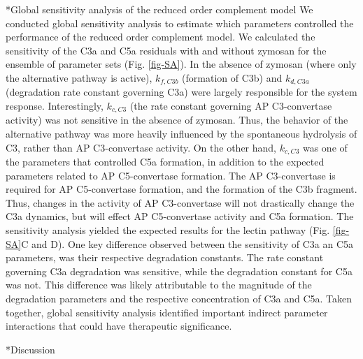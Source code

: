 \documentclass[12pt]{article}
\makeatletter
\renewcommand\subsection{\@startsection
	{subsection}{2}{0mm}
	{-0.05in}
	{-0.5\baselineskip}
	{\normalfont\normalsize\bfseries}}
\renewcommand\section{\@startsection
	{subsection}{2}{0mm}
	{-0.2in}
	{0.05\baselineskip}
	{\normalfont\large\bfseries}}
\makeatother
\begin{document}
\subsection*{Global sensitivity analysis of the reduced order complement model}
We conducted global sensitivity analysis to estimate which parameters controlled the performance of the reduced order complement model.
We calculated the sensitivity of the C3a and C5a residuals with and without zymosan for the ensemble of parameter sets (Fig. \ref{fig-SA}).
In the absence of zymosan (where only the alternative pathway is active), $k_{f,C3b}$ (formation of C3b) and $k_{d,C3a}$ (degradation rate constant governing C3a)
were largely responsible for the system response. Interestingly, $k_{c,C3}$ (the rate constant governing AP C3-convertase activity) was not sensitive in the absence of zymosan.
Thus, the behavior of the alternative pathway was more heavily influenced by the spontaneous hydrolysis of C3, rather than AP C3-convertase activity.
On the other hand, $k_{c,C3}$ was one of the parameters that controlled C5a formation, in addition to the expected parameters related to AP C5-convertase formation.
The AP C3-convertase is required for AP C5-convertase formation, and the formation of the C3b fragment.
Thus, changes in the activity of AP C3-convertase will not drastically change the C3a dynamics, but will effect AP C5-convertase activity and C5a formation.
The sensitivity analysis yielded the expected results for the lectin pathway (Fig. \ref{fig-SA}C and D).
One key difference observed between the sensitivity of C3a an C5a parameters, was their respective degradation constants.
The rate constant governing C3a degradation was sensitive, while the degradation constant for C5a was not.
This difference was likely attributable to the magnitude of the degradation parameters and the respective concentration of C3a and C5a.
Taken together, global sensitivity analysis identified important indirect parameter interactions that could have therapeutic significance.

\clearpage


\section*{Discussion}
\end{document}
